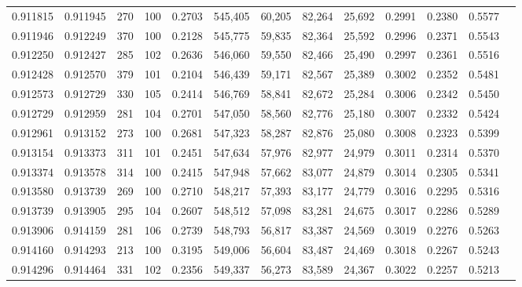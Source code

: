 \begin{tabular}{rrrrrrrrrrrrr}
0.911815 & 0.911945 &   270 & 100 &                                     0.2703 & 545,405 &  60,205 &  82,264 &  25,692 & 0.2991 & 0.2380 & 0.5577 \\
0.911946 & 0.912249 &   370 & 100 &                                     0.2128 & 545,775 &  59,835 &  82,364 &  25,592 & 0.2996 & 0.2371 & 0.5543 \\
0.912250 & 0.912427 &   285 & 102 &                                     0.2636 & 546,060 &  59,550 &  82,466 &  25,490 & 0.2997 & 0.2361 & 0.5516 \\
0.912428 & 0.912570 &   379 & 101 &                                     0.2104 & 546,439 &  59,171 &  82,567 &  25,389 & 0.3002 & 0.2352 & 0.5481 \\
0.912573 & 0.912729 &   330 & 105 &                                     0.2414 & 546,769 &  58,841 &  82,672 &  25,284 & 0.3006 & 0.2342 & 0.5450 \\
0.912729 & 0.912959 &   281 & 104 &                                     0.2701 & 547,050 &  58,560 &  82,776 &  25,180 & 0.3007 & 0.2332 & 0.5424 \\
0.912961 & 0.913152 &   273 & 100 &                                     0.2681 & 547,323 &  58,287 &  82,876 &  25,080 & 0.3008 & 0.2323 & 0.5399 \\
0.913154 & 0.913373 &   311 & 101 &                                     0.2451 & 547,634 &  57,976 &  82,977 &  24,979 & 0.3011 & 0.2314 & 0.5370 \\
0.913374 & 0.913578 &   314 & 100 &                                     0.2415 & 547,948 &  57,662 &  83,077 &  24,879 & 0.3014 & 0.2305 & 0.5341 \\
0.913580 & 0.913739 &   269 & 100 &                                     0.2710 & 548,217 &  57,393 &  83,177 &  24,779 & 0.3016 & 0.2295 & 0.5316 \\
0.913739 & 0.913905 &   295 & 104 &                                     0.2607 & 548,512 &  57,098 &  83,281 &  24,675 & 0.3017 & 0.2286 & 0.5289 \\
0.913906 & 0.914159 &   281 & 106 &                                     0.2739 & 548,793 &  56,817 &  83,387 &  24,569 & 0.3019 & 0.2276 & 0.5263 \\
0.914160 & 0.914293 &   213 & 100 &                                     0.3195 & 549,006 &  56,604 &  83,487 &  24,469 & 0.3018 & 0.2267 & 0.5243 \\
0.914296 & 0.914464 &   331 & 102 &                                     0.2356 & 549,337 &  56,273 &  83,589 &  24,367 & 0.3022 & 0.2257 & 0.5213 \\

\end{tabular}

